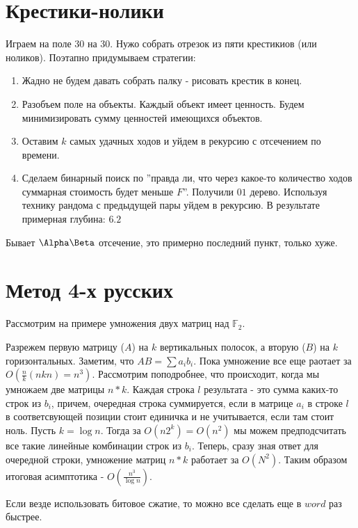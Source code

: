 \section{Крестики-нолики}
Играем на поле 30 на 30. Нужо собрать отрезок из пяти крестикиов (или ноликов). 
Поэтапно придумываем стратегии:
\begin{enumerate}
  \item Жадно не будем давать собрать палку - рисовать крестик в конец.
  \item Разобъем поле на объекты. Каждый объект имеет ценность. Будем минимизировать сумму ценностей имеющихся объектов.
  \item Оставим $k$ самых удачных ходов и уйдем в рекурсию с отсечением по времени.
  \item Сделаем бинарный поиск по ''правда ли, что через какое-то количество ходов суммарная стоимость будет меньше $F$''. Получили $01$ дерево. 
    Используя технику рандома с предыдущей пары уйдем в рекурсию. В результате примерная глубина: $6.2$
\end{enumerate}
Бывает $\Alpha\Beta$ отсечение, это примерно последний пункт, только хуже.

\section{Метод 4-х русских}
\par Рассмотрим на примере умножения двух матриц над $\mathbb{F}_2$.
\par Разрежем первую матрицу ($A$) на $k$ вертикальных полосок, а вторую ($B$) на $k$ горизонтальных. Заметим, что $AB = \sum{a_ib_i}$. 
  Пока умножение все еще раотает за $O(\frac{n}{k}(nkn) = n^3)$. Рассмотрим поподробнее, что происходит, когда мы умножаем две матрицы $n*k$. 
  Каждая строка $l$ результата - это сумма каких-то строк из $b_i$, причем, очередная строка суммируется, если в матрице $a_i$ в строке $l$ в соответсвующей позиции стоит
  единичка и не учитывается, если там стоит ноль. Пусть $k = \log{n}$. Тогда за $O(n2^k) = O(n^2)$ мы можем предподсчитать все такие линейные комбинации строк из $b_i$. 
  Теперь, сразу зная ответ для очередной строки, умножение матриц $n*k$ работает за $O(N^2)$. Таким образом итоговая асимптотика - $O(\frac{n^3}{\log{n}})$. 
\par Если везде использовать битовое сжатие, то можно все сделать еще в $word$ раз быстрее.


